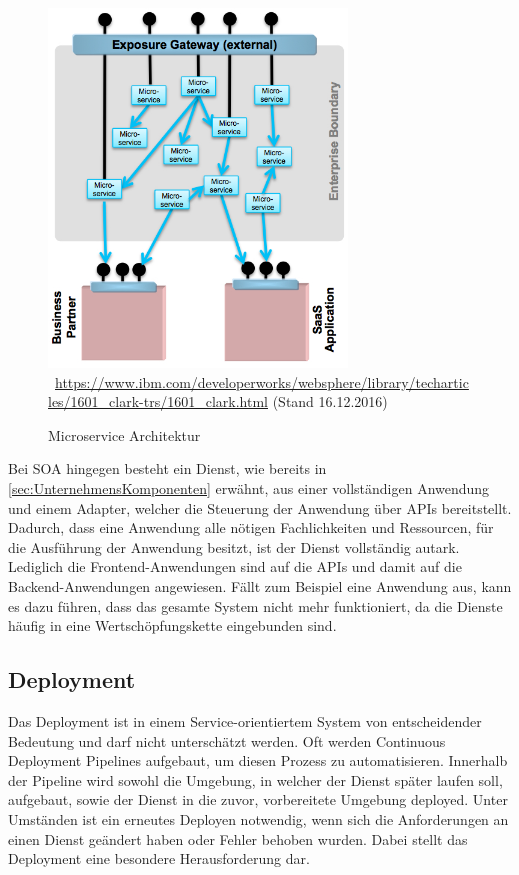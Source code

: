 \begin{figure}[htb]
    \centering 
    \includegraphics[width=300px]{content/images/figure6}\
    \quelle\url{https://www.ibm.com/developerworks/websphere/library/techarticles/1601_clark-trs/1601_clark.html} (Stand 16.12.2016)
    \caption{Microservice Architektur}
    \label{fig:MicroserviceArchitekturInGreenField} 
\end{figure}
\newpage
Bei SOA hingegen besteht ein Dienst, wie bereits in \ref{sec:UnternehmensKomponenten}  erwähnt, aus einer vollständigen Anwendung und einem Adapter, welcher die Steuerung der Anwendung über APIs bereitstellt. Dadurch, dass eine Anwendung alle nötigen Fachlichkeiten und Ressourcen, für die Ausführung der Anwendung besitzt, ist der Dienst vollständig autark. Lediglich die Frontend-Anwendungen sind auf die APIs und damit auf die Backend-Anwendungen angewiesen. Fällt zum Beispiel eine Anwendung aus, kann es dazu führen, dass das gesamte System nicht mehr funktioniert, da die Dienste häufig in eine Wertschöpfungskette eingebunden sind.

\subsection{Deployment}
\label{subsec:Deployment}
Das Deployment ist in einem Service-orientiertem System von entscheidender Bedeutung und darf nicht unterschätzt werden. Oft werden Continuous Deployment Pipelines aufgebaut, um diesen Prozess zu automatisieren. Innerhalb der Pipeline wird sowohl die Umgebung, in welcher der Dienst später laufen soll, aufgebaut, sowie der Dienst in die zuvor, vorbereitete Umgebung deployed. Unter Umständen ist ein erneutes Deployen notwendig, wenn sich die Anforderungen an einen Dienst geändert haben oder Fehler behoben wurden. Dabei stellt das Deployment eine besondere Herausforderung dar. 

